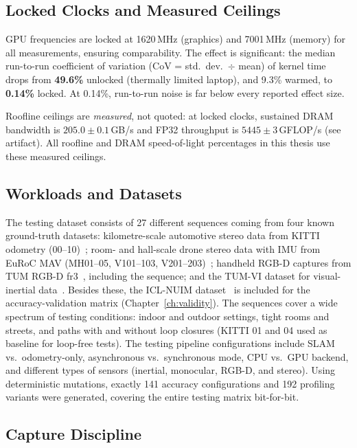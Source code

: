 \subsection{Locked Clocks and Measured Ceilings}
\label{sec:met-clocks}

GPU frequencies are locked at 1620\,MHz (graphics) and 7001\,MHz (memory) for all measurements, ensuring comparability. The effect is significant: the median run-to-run coefficient of variation (CoV = std.\ dev.\ $\div$ mean) of kernel time drops from \textbf{49.6\%} unlocked (thermally limited laptop), and 9.3\% warmed, to \textbf{0.14\%} locked. At 0.14\%, run-to-run noise is far below every reported effect size.

Roofline ceilings are \emph{measured}, not quoted: at locked clocks, sustained DRAM bandwidth is $205.0 \pm 0.1$\,GB/s and FP32 throughput is $5445 \pm 3$\,GFLOP/s (see artifact). All roofline and DRAM speed-of-light percentages in this thesis use these measured ceilings.

\subsection{Workloads and Datasets}
\label{sec:met-datasets}

The testing dataset consists of 27 different sequences coming from four known ground-truth datasets: kilometre-scale automotive stereo data from KITTI odometry (00--10)~\cite{geiger2013kitti}; room- and hall-scale drone stereo data with IMU from EuRoC MAV (MH01--05, V101--103, V201--203)~\cite{burri2016euroc}; handheld RGB-D captures from TUM RGB-D fr3~\cite{sturm2012tum}, including the  sequence; and the TUM-VI dataset for visual-inertial data~\cite{schubert2018tumvi}. Besides these, the ICL-NUIM dataset~\cite{handa2014iclnuim} is included for the accuracy-validation matrix (Chapter~\ref{ch:validity}). The sequences cover a wide spectrum of testing conditions: indoor and outdoor settings, tight rooms and streets, and paths with and without loop closures (KITTI 01 and 04 used as baseline for loop-free tests). The testing pipeline configurations include SLAM vs.\ odometry-only, asynchronous vs.\ synchronous mode, CPU vs.\ GPU backend, and different types of sensors (inertial, monocular, RGB-D, and stereo). Using deterministic mutations, exactly 141 accuracy configurations and 192 profiling variants were generated, covering the entire testing matrix bit-for-bit.

\subsection{Capture Discipline}

